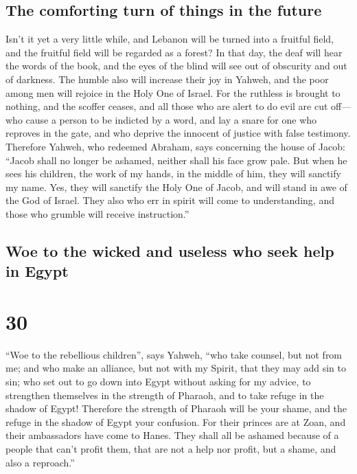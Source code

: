 \hypertarget{the-comforting-turn-of-things-in-the-future}{%
\subsection{The comforting turn of things in the
future}\label{the-comforting-turn-of-things-in-the-future}}

 Isn't it yet a very little while, and Lebanon will be
turned into a fruitful field, and the fruitful field will be regarded as
a forest?  In that day, the deaf will hear the words of
the book, and the eyes of the blind will see out of obscurity and out of
darkness.  The humble also will increase their joy in
Yahweh, and the poor among men will rejoice in the Holy One of Israel.
 For the ruthless is brought to nothing, and the scoffer
ceases, and all those who are alert to do evil are cut off---
 who cause a person to be indicted by a word, and lay a
snare for one who reproves in the gate, and who deprive the innocent of
justice with false testimony.  Therefore Yahweh, who
redeemed Abraham, says concerning the house of Jacob: ``Jacob shall no
longer be ashamed, neither shall his face grow pale.  But
when he sees his children, the work of my hands, in the middle of him,
they will sanctify my name. Yes, they will sanctify the Holy One of
Jacob, and will stand in awe of the God of Israel.  They
also who err in spirit will come to understanding, and those who grumble
will receive instruction.''

\hypertarget{woe-to-the-wicked-and-useless-who-seek-help-in-egypt}{%
\subsection{Woe to the wicked and useless who seek help in
Egypt}\label{woe-to-the-wicked-and-useless-who-seek-help-in-egypt}}

\hypertarget{section-29}{%
\section{30}\label{section-29}}

 ``Woe to the rebellious children'', says Yahweh, ``who
take counsel, but not from me; and who make an alliance, but not with my
Spirit, that they may add sin to sin;  who set out to go
down into Egypt without asking for my advice, to strengthen themselves
in the strength of Pharaoh, and to take refuge in the shadow of Egypt!
 Therefore the strength of Pharaoh will be your shame, and
the refuge in the shadow of Egypt your confusion.  For
their princes are at Zoan, and their ambassadors have come to Hanes.
 They shall all be ashamed because of a people that can't
profit them, that are not a help nor profit, but a shame, and also a
reproach.''

